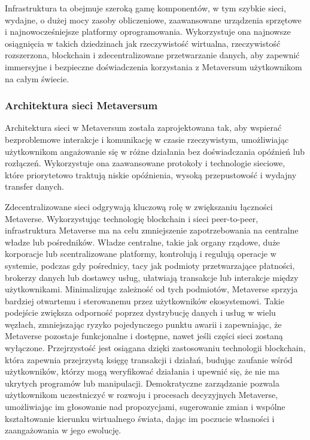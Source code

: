 Infrastruktura ta obejmuje szeroką gamę komponentów, w tym szybkie sieci, wydajne, o dużej mocy zasoby obliczeniowe, zaawansowane urządzenia sprzętowe i najnowocześniejsze platformy oprogramowania. Wykorzystuje ona najnowsze osiągnięcia w takich dziedzinach jak rzeczywistość wirtualna, rzeczywistość rozszerzona, blockchain i zdecentralizowane przetwarzanie danych, aby zapewnić immersyjne i bezpieczne doświadczenia korzystania z Metaversum użytkownikom na całym świecie\cite{metaverseInfrastructureIEEE}.

\subsubsection{Architektura sieci Metaversum}

Architektura sieci w Metaversum została zaprojektowana tak, aby wspierać bezproblemowe interakcje i komunikację w czasie rzeczywistym, umożliwiając użytkownikom angażowanie się w różne działania bez doświadczania opóźnień lub rozłączeń. Wykorzystuje ona zaawansowane protokoły i technologie sieciowe, które priorytetowo traktują niskie opóźnienia, wysoką przepustowość i wydajny transfer danych\cite{metaverseInfrastructureIEEE}.

Zdecentralizowane sieci odgrywają kluczową rolę w zwiększaniu łączności Metaverse. Wykorzystując technologię blockchain i sieci peer-to-peer, infrastruktura Metaverse ma na celu zmniejszenie zapotrzebowania na centralne władze lub pośredników. Władze centralne, takie jak organy rządowe, duże korporacje lub scentralizowane platformy, kontrolują i regulują operacje w systemie, podczas gdy pośrednicy, tacy jak podmioty przetwarzające płatności, brokerzy danych lub dostawcy usług, ułatwiają transakcje lub interakcje między użytkownikami. Minimalizując zależność od tych podmiotów, Metaverse sprzyja bardziej otwartemu i sterowanemu przez użytkowników ekosystemowi. Takie podejście zwiększa odporność poprzez dystrybucję danych i usług w wielu węzłach, zmniejszając ryzyko pojedynczego punktu awarii i zapewniając, że Metaverse pozostaje funkcjonalne i dostępne, nawet jeśli części sieci zostaną wyłączone. Przejrzystość jest osiągana dzięki zastosowaniu technologii blockchain, która zapewnia przejrzystą księgę transakcji i działań, budując zaufanie wśród użytkowników, którzy mogą weryfikować działania i upewnić się, że nie ma ukrytych programów lub manipulacji. Demokratyczne zarządzanie pozwala użytkownikom uczestniczyć w rozwoju i procesach decyzyjnych Metaverse, umożliwiając im głosowanie nad propozycjami, sugerowanie zmian i wspólne kształtowanie kierunku wirtualnego świata, dając im poczucie własności i zaangażowania w jego ewolucję\cite{metaverseInfrastructureIEEE}.

